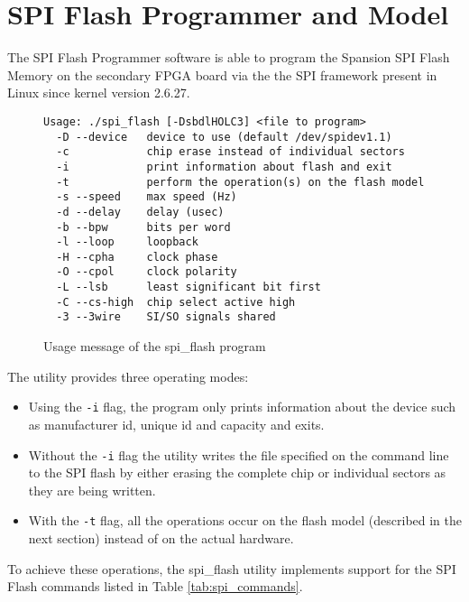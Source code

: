 

\newpage
\section{SPI Flash Programmer and Model}
The SPI Flash Programmer software is able to program the Spansion SPI Flash Memory
on the secondary FPGA board via the the SPI framework present in Linux
since kernel version 2.6.27.

\begin{figure}[h!]
\lstset{basicstyle=\scriptsize\ttfamily}
\begin{lstlisting}
Usage: ./spi_flash [-DsbdlHOLC3] <file to program>
  -D --device   device to use (default /dev/spidev1.1)
  -c            chip erase instead of individual sectors
  -i            print information about flash and exit
  -t            perform the operation(s) on the flash model
  -s --speed    max speed (Hz)
  -d --delay    delay (usec)
  -b --bpw      bits per word
  -l --loop     loopback
  -H --cpha     clock phase
  -O --cpol     clock polarity
  -L --lsb      least significant bit first
  -C --cs-high  chip select active high
  -3 --3wire    SI/SO signals shared
\end{lstlisting}
\caption{Usage message of the spi\_flash program}
\end{figure}

The utility provides three operating modes:

\begin{itemize}
 \item Using the \texttt{-i} flag, the program only prints information about the device such as manufacturer id, unique id and capacity and exits.
 \item Without the \texttt{-i} flag the utility writes the file specified on the command line to the SPI flash by either erasing the complete chip or individual sectors as they are being written.
 \item With the \texttt{-t} flag, all the operations occur on the flash model (described in the next section) instead of on the actual hardware.
\end{itemize}

To achieve these operations, the spi\_flash utility implements support for the SPI Flash commands listed in Table \ref{tab:spi_commands}.

